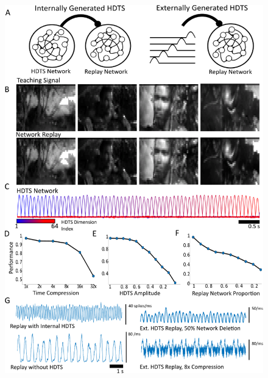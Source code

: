 \documentclass[11pt]{article} %
\begin{document}
\begin{figure}[htp!]
\centering
\includegraphics[scale=0.87]{FFIG5}
\caption{}\label{FORCE6}
\end{figure}
\end{document}
